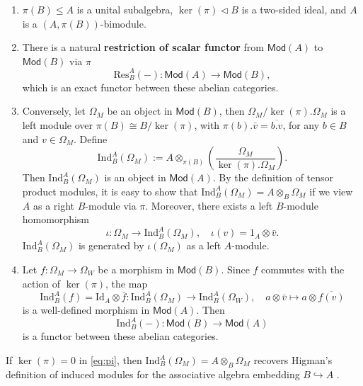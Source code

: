 \documentclass[12pt,a4paper,reqno]{amsart}
\numberwithin{equation}{section}
\numberwithin{equation}{section}
\theoremstyle{definition}
\def \ra {\rightarrow}
\def\hr{\hookrightarrow}
\def\Id{\mathrm{Id}}
\def\Ind{\mathrm{Ind}}
\def\Res{\mathrm{Res}}
\def\o{\otimes}
\def\Om{\Omega}
\def\Ind{\mathrm{Ind}}
\def\Mod{\mathsf{Mod}}
\begin{document}
	\begin{enumerate}
		\item $\pi(B)\leq A$ is a unital subalgebra, $\ker(\pi)\lhd B$ is a two-sided ideal, and $A$ is a $(A,\pi(B))$-bimodule. 
		\item
		There is a natural {\bf restriction of scalar functor} from $\Mod(A)$ to $\Mod(B)$ via $\pi$
		$$\Res^A_B(-):\Mod(A)\ra \Mod(B),$$
		which is an exact functor between these abelian categories.  
		\item  Conversely, let $\Om_M$ be an object in $\Mod(B)$, then $\Om_M/\ker(\pi).\Om_M$ is a left module over $\pi(B)\cong B/\ker(\pi)$, with $\pi(b).\bar{v}=\overline{b.v}$, for any $b\in B$ and $v\in \Om_M$. Define
		\begin{equation}\label{eq:defassocind}
			\Ind_B^A (\Om_M):=A\o_{\pi(B)} \left(\frac{\Om_M}{\ker(\pi).\Om_M}\right). 
		\end{equation}
		Then $	\Ind_B^A (\Om_M)$ is an object in $\Mod(A)$. By the definition of tensor product modules, it is easy to show that $	\Ind_B^A (\Om_M)=A\o_B \Om_M$ if we view $A$ as a right $B$-module via $\pi$. 
		Moreover, there exists a left $B$-module homomorphism 
		$$
		\iota:\Om_M\ra \Ind_B^A(\Om_M),\quad \iota(v)=1_A\o\bar{v}.
		$$
		$\Ind^A_B(\Om_M)$ is generated by $\iota(\Om_M)$ as a left $A$-module. 
		\item Let $f:\Om_M\ra \Om_W$ be a morphism in $\Mod(B)$. Since $f$ commutes with the action of $\ker(\pi)$, the map
		\begin{equation}\label{eq:indonmorphism}
			\Ind_B^A(f)=\Id_A\o \bar{f}:	\Ind_B^A (\Om_M)\ra 	\Ind_B^A (\Om_W),\quad a\o\bar{v}\mapsto a\o \overline{f(v)}
		\end{equation}
		is a well-defined morphism in $\Mod(A)$. Then $$\Ind_B^A(-):\Mod(B)\ra\Mod(A)$$ is a functor between these abelian categories. %
	\end{enumerate}
	If $\ker (\pi)=0$ in \eqref{eq:pi}, then $\Ind_B^A (\Om_M)=A\o_B\Om_M$ recovers Higman's definition of induced modules for the associative algebra embedding $B\hr A$ \cite{Hig55}. 
\end{document}
